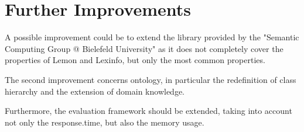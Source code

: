 \section{Further Improvements}
\label{sec:improvements}

A possible improvement could be to extend the library provided by the "Semantic Computing Group @ Bielefeld University" as it does not completely cover the properties of Lemon and Lexinfo, but only the most common properties. 

The second improvement concerns ontology, in particular the redefinition of class hierarchy and the extension of domain knowledge.

Furthermore, the evaluation framework should be extended, taking into account not only the response.time, but also the memory usage.